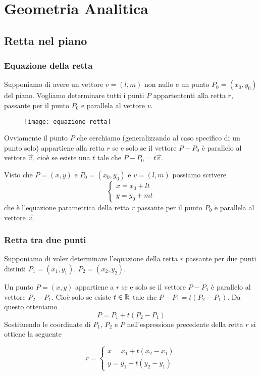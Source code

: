 \chapter{Geometria Analitica}

\section{Retta nel piano}

\subsection{Equazione della retta}

Supponiamo di avere un vettore $v = (l,m)$ non nullo e un punto $P_0 = (x_0,y_0)$ del piano. Vogliamo determinare tutti i punti $P$ appartententi alla retta $r$, passante per il punto $P_0$ e parallela al vettore $v$.

\begin{figure}[H]
\texttt{[image: equazione-retta]}
\centering
\end{figure}

Ovviamente il punto $P$ che cerchiamo (generalizzando al caso specifico di un punto solo) appartiene alla retta $r$ se e solo se il vettore $P-P_0$ è parallelo al vettore $\vec{v}$, cioè se esiste una $t$ tale che $P-P_0=t\vec{v}$.

Visto che $P=(x,y)$ e $P_0=(x_0,y_0)$ e $v = (l,m)$ possiamo scrivere
$$
\begin{cases}
x = x_0 + lt \\
y = y_0 + mt
\end{cases}
$$
che è l'equazione parametrica della retta $r$ passante per il punto $P_0$ e parallela al vettore $\vec{v}$.

\subsection{Retta tra due punti}

Supponiamo di voler determinare l'equazione della retta $r$ passante per due punti distinti $P_1=(x_1,y_1)$, $P_2=(x_2,y_2)$.

Un punto $P=(x,y)$ appartiene a $r$ se e solo se il vettore $P-P_1$ è parallelo al vettore $P_2-P_1$. Cioè solo se esiste $t \in \mathbb{R}$ tale che $P-P_1=t(P_2-P_1)$. Da questo otteniamo $$P = P_1+t(P_2-P_1)$$
Sostituendo le coordinate di $P_1$, $P_2$ e $P$ nell'espressione precedente della retta $r$ si ottiene la seguente

$$
r=
\begin{cases}
x = x_1 + t(x_2-x_1) \\
y = y_1 + t(y_2-y_1)
\end{cases}
$$

